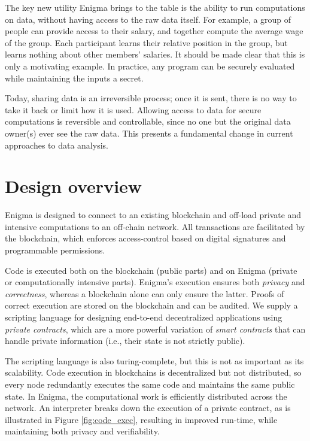 \documentclass{article} \usepackage{nips13submit_e,times}
\begin{document}
The key new utility Enigma brings to the table is the ability to run computations on data, without having access to the raw data itself. For example, a group of people can provide access to their salary, and together compute the average wage of the group. Each participant learns their relative position in the group, but learns nothing about other members' salaries. It should be made clear that this is only a motivating example. In practice, any program can be securely evaluated while maintaining the inputs a secret. 



Today, sharing data is an irreversible process; once it is sent, there is no way to take it back or limit how it is used. Allowing access to data for secure computations is reversible and controllable, since no one but the original data owner(s) ever see the raw data. This presents a fundamental change in current approaches to data analysis.

\section{Design overview}



Enigma is designed to connect to an existing blockchain and off-load private and intensive computations to an off-chain network. All transactions are facilitated by the blockchain, which enforces access-control based on digital signatures and programmable permissions.

Code is executed both on the blockchain (public parts) and on Enigma (private or computationally intensive parts). Enigma's execution ensures both \textit{privacy} and \textit{correctness}, whereas a blockchain alone can only ensure the latter. Proofs of correct execution are stored on the blockchain and can be audited. We supply a scripting language for designing end-to-end decentralized applications using \textit{private contracts}, which are a more powerful variation of \textit{smart contracts} that can handle private information (i.e., their state is not strictly public).

The scripting language is also turing-complete, but this is not as important as its scalability. Code execution in blockchains is decentralized but not distributed, so every node redundantly executes the same code and maintains the same public state. In Enigma, the computational work is efficiently distributed across the network. An interpreter breaks down the execution of a private contract, as is illustrated in Figure \ref{fig:code_exec}, resulting in improved run-time, while maintaining both privacy and verifiability.
\end{document}
